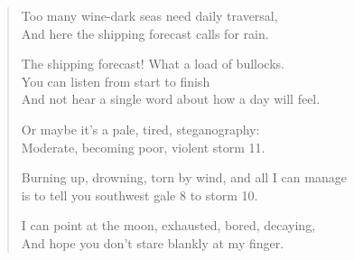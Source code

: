 \begin{verse}
  Too many wine-dark seas need daily traversal,\\
  And here the shipping forecast calls for rain.

  The shipping forecast! What a load of bullocks.\\
  You can listen from start to finish\\
  And not hear a single word about how a day will feel.

  Or maybe it's a pale, tired, steganography:\\
  Moderate, becoming poor, violent storm 11.

  Burning up, drowning, torn by wind, and all I can manage\\
  is to tell you southwest gale 8 to storm 10.

  I can point at the moon, exhausted, bored, decaying,\\
  And hope you don't stare blankly at my finger.
\end{verse}
